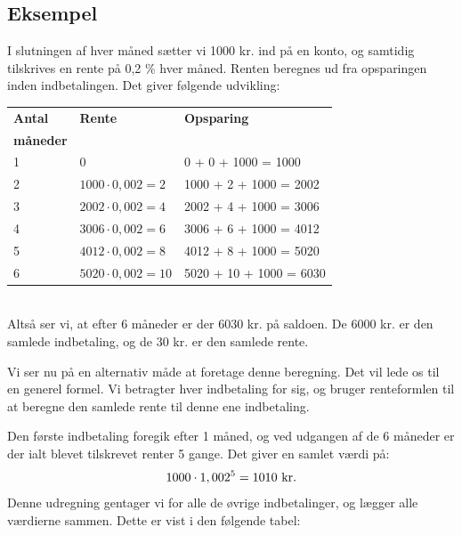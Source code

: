 \documentclass[12pt,oneside,a4paper]{article}
\begin{document}
\begin{tcolorbox}
\subsection{Eksempel}
I slutningen af hver måned sætter vi 1000 kr. ind på en konto, og samtidig
tilskrives en rente på 0,2 $\%$ hver måned. Renten beregnes ud fra
opsparingen inden indbetalingen.  Det giver følgende udvikling:
\\

\begin{tabular}{|l|l|l|}
    \hline
    \textbf{Antal} & \textbf{Rente} & \textbf{Opsparing} \\
    \textbf{måneder} &  & \\
    \hline
    1 & 0 & 0 + 0 + 1000 = 1000 \\
    \hline
    2 & $1000\cdot 0,002 = 2$ & 1000 + 2 + 1000 = 2002 \\
    \hline
    3 & $2002\cdot 0,002 = 4$ & 2002 + 4 + 1000 = 3006 \\
    \hline
    4 & $3006\cdot 0,002 = 6$ & 3006 + 6 + 1000 = 4012 \\
    \hline
    5 & $4012\cdot 0,002 = 8$ & 4012 + 8 + 1000 = 5020 \\
    \hline
    6 & $5020\cdot 0,002 = 10$ & 5020 + 10 + 1000 = 6030 \\
    \hline
\end{tabular}
\\

Altså ser vi, at efter 6 måneder er der 6030 kr. på saldoen. De 6000 kr. er den
samlede indbetaling, og de 30 kr. er den samlede rente.
\end{tcolorbox}

Vi ser nu på en alternativ måde at foretage denne beregning. Det vil lede os
til en generel formel. Vi betragter hver indbetaling for sig, og bruger
renteformlen til at beregne den samlede rente til denne ene indbetaling.

Den første indbetaling foregik efter 1 måned, og ved udgangen af de 6 måneder
er der ialt blevet tilskrevet renter 5 gange.  Det giver en samlet værdi på:
\[
    1000\cdot 1,002^5 = 1010 {\,\,\rm kr.}
\]
Denne udregning gentager vi for alle de øvrige indbetalinger, og lægger alle
værdierne sammen.  Dette er vist i den følgende tabel:
\\
\end{document}
